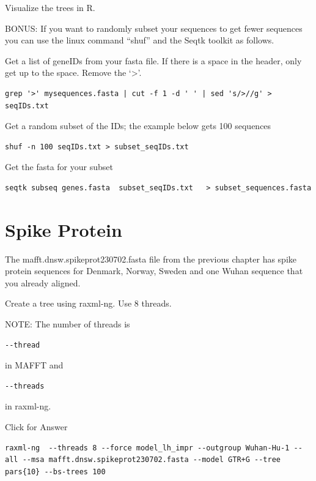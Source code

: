 \documentclass[
]{book}
\begin{document}
Visualize the trees in R.

BONUS: If you want to randomly subset your sequences to get fewer sequences you can use the linux command ``shuf'' and the Seqtk toolkit as follows.

Get a list of geneIDs from your fasta file. If there is a space in the header, only get up to the space. Remove the `\textgreater{}'.

\begin{verbatim}
grep '>' mysequences.fasta | cut -f 1 -d ' ' | sed 's/>//g' > seqIDs.txt
\end{verbatim}

Get a random subset of the IDs; the example below gets 100 sequences

\begin{verbatim}
shuf -n 100 seqIDs.txt > subset_seqIDs.txt
\end{verbatim}

Get the fasta for your subset

\begin{verbatim}
seqtk subseq genes.fasta  subset_seqIDs.txt   > subset_sequences.fasta
\end{verbatim}

\hypertarget{spike-protein-2}{%
\section{Spike Protein}\label{spike-protein-2}}

The mafft.dnsw.spikeprot230702.fasta file from the previous chapter has spike protein sequences for Denmark, Norway, Sweden and one Wuhan sequence that you already aligned.

Create a tree using raxml-ng. Use 8 threads.

NOTE: The number of threads is

\begin{verbatim}
--thread
\end{verbatim}

in MAFFT and

\begin{verbatim}
--threads
\end{verbatim}

in raxml-ng.

Click for Answer

\begin{verbatim}
raxml-ng  --threads 8 --force model_lh_impr --outgroup Wuhan-Hu-1 --all --msa mafft.dnsw.spikeprot230702.fasta --model GTR+G --tree pars{10} --bs-trees 100
\end{verbatim}
\end{document}
